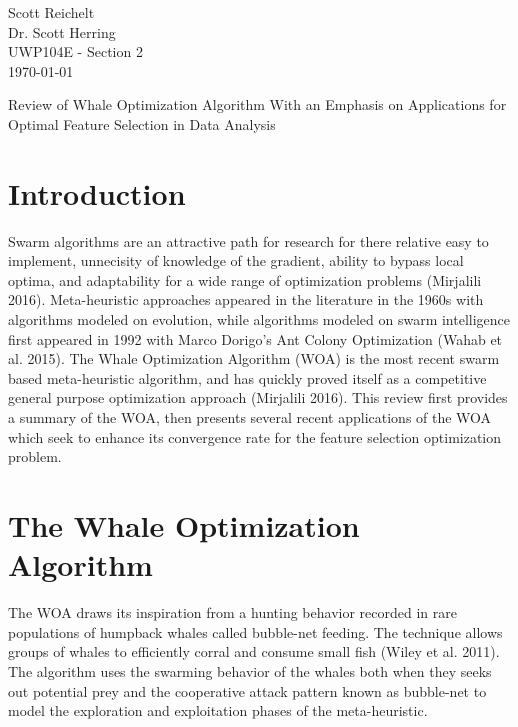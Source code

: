 \documentclass[11pt]{article}
\begin{document}
{ %
    \thispagestyle{empty}
    \begin{flushleft}
        Scott Reichelt\\
        Dr. Scott Herring\\
        UWP104E - Section 2\\
        \today\\
    \end{flushleft}
    \vspace{1em}
}
    \begin{center}
        Review of Whale Optimization Algorithm With an Emphasis on Applications for Optimal Feature Selection in Data Analysis
    \end{center}

\section*{Introduction} {
    Swarm algorithms are an attractive path for research for there relative easy to implement, unnecisity of knowledge of the gradient, ability to bypass local optima, and adaptability for a wide range of optimization problems (Mirjalili 2016).
    Meta-heuristic approaches appeared in the literature in the 1960s with algorithms modeled on evolution, while algorithms modeled on swarm intelligence first appeared in 1992 with Marco Dorigo's Ant Colony Optimization (Wahab et al. 2015).
    The Whale Optimization Algorithm (WOA) is the most recent swarm based meta-heuristic algorithm, and has quickly proved itself as a competitive general purpose optimization approach (Mirjalili 2016). 
    This review first provides a summary of the WOA, then presents several recent applications of the WOA which seek to enhance its convergence rate for the feature selection optimization problem.
}

\section*{The Whale Optimization Algorithm}{
    The WOA draws its inspiration from a hunting behavior recorded in rare populations of humpback whales called bubble-net feeding.
    The technique allows groups of whales to efficiently corral and consume small fish (Wiley et al. 2011).
    The algorithm uses the swarming behavior of the whales both when they seeks out potential prey and the cooperative attack pattern known as bubble-net to model the exploration and exploitation phases of the meta-heuristic.
}
\end{document}
